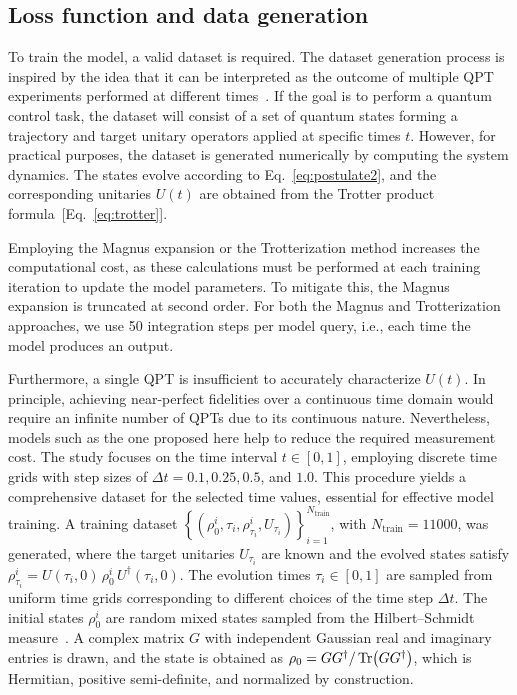 \FloatBarrier

\subsection{Loss function and data generation}
\label{sec:res-loss-function}

To train the model, a valid dataset is required. The dataset generation process is inspired by the idea that it can be interpreted as the outcome of multiple QPT experiments performed at different times~\cite{huang2025}. If the goal is to perform a quantum control task, the dataset will consist of a set of quantum states forming a trajectory and target unitary operators applied at specific times $t$. However, for practical purposes, the dataset is generated numerically by computing the system dynamics. The states evolve according to Eq.~\eqref{eq:postulate2}, and the corresponding unitaries $U(t)$ are obtained from the Trotter product formula~[Eq.~\eqref{eq:trotter}].

Employing the Magnus expansion or the Trotterization method increases the computational cost, as these calculations must be performed at each training iteration to update the model parameters. To mitigate this, the Magnus expansion is truncated at second order. For both the Magnus and Trotterization approaches, we use 50 integration steps per model query, i.e., each time the model produces an output.

Furthermore, a single QPT is insufficient to accurately characterize $U(t)$. In principle, achieving near-perfect fidelities over a continuous time domain would require an infinite number of QPTs due to its continuous nature. Nevertheless, models such as the one proposed here help to reduce the required measurement cost. The study focuses on the time interval $t \in [0, 1]$, employing discrete time grids with step sizes of $\Delta t = 0.1, 0.25, 0.5$, and $1.0$. This procedure yields a comprehensive dataset for the selected time values, essential for effective model training. A training dataset $\left\{ \left( \rho_0^i, \tau_i, \rho_{\tau_i}^i, U_{\tau_i} \right) \right\}_{i=1}^{N_{\mathrm{train}}}$, with $N_{\mathrm{train}} = 11000$, was generated, where the target unitaries $U_{\tau_i}$ are known and the evolved states satisfy $\rho_{\tau_i}^i = U(\tau_i,0)\, \rho_0^i\, U^{\dagger}(\tau_i,0)$. The evolution times $\tau_i \in [0,1]$ are sampled from uniform time grids corresponding to different choices of the time step $\Delta t$. The initial states $\rho_0^i$ are random mixed states sampled from the Hilbert--Schmidt measure~\cite{zyczkowski2001}. A complex matrix $G$ with independent Gaussian real and imaginary entries is drawn, and the state is obtained as $\rho_0 = G G^\dagger / \Tr(G G^\dagger)$, which is Hermitian, positive semi-definite, and normalized by construction.

